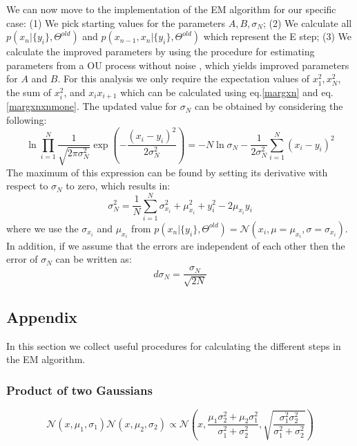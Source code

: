 \documentclass[%
 reprint,
 amsmath,amssymb,
 aps,
]{revtex4-1}
\begin{document}
We can now move to the implementation of the EM algorithm for our specific case: (1) We pick starting values for the parameters ${A,B,\sigma_N}$; (2) We calculate all $p\left( x_{n}|\{y_{i}\},\Theta^{old}\right)$ and $p\left( x_{n-1},x_{n}|\{y_{i}\},\Theta^{old}\right)$ which represent the E step; (3) We calculate the improved parameters by using the procedure for estimating parameters from a OU process without noise \cite{PRE}, which yields improved parameters for $A$ and $B$.  For this analysis we only require the expectation values of $x_{1}^{2},x_{N}^2$, the sum of $x_{i}^2$, and $x_{i}x_{i+1}$ which can be calculated using eq.\ref{margxn} and eq.\ref{margxnxnmone}.  The updated value for $\sigma_{N}$ can be obtained by considering the following:
\begin{equation}
	\ln \prod_{i=1}^{N}\frac{1}{\sqrt{2\pi\sigma_{N}^{2}}}\exp\left(-\frac{(x_{i}-y_{i})^2}{2\sigma_{N}^{2}}\right)=-N\ln\sigma_{N}-\frac{1}{2\sigma_{N}^2}\sum_{i=1}^{N}(x_{i}-y_{i})^2
\end{equation}
The maximum of this expression can be found by setting its derivative with respect to $\sigma_N$ to zero, which results in:
\begin{equation}
	\sigma_{N}^{2} = \frac{1}{N}\sum_{i=1}^{N}\sigma_{x_{i}}^{2}+\mu_{x_{i}}^{2}+y_{i}^{2}-2\mu_{x_{i}}y_{i}
\end{equation}
where we use the $\sigma_{x_{i}}$ and $\mu_{x_{i}}$ from $p\left( x_{n}|\{y_{i}\},\Theta^{old}\right)=\mathcal{N}(x_{i},\mu=\mu_{x_{i}},\sigma=\sigma_{x_{i}})$.  In addition, if we assume that the errors are independent of each other then the error of $\sigma_{N}$ can be written as:
\begin{equation}
	d\sigma_{N} = \frac{\sigma_{N}}{\sqrt{2N}}
\end{equation}
\subsection{Appendix}
In this section we collect useful procedures for calculating the different steps in the EM algorithm.
\subsubsection{Product of two Gaussians}
\begin{equation}
\mathcal{N}(x,\mu_{1},\sigma_{1})\mathcal{N}(x,\mu_{2},\sigma_{2}) 
\propto \mathcal{N}\left(x,\frac{\mu_{1}\sigma_{2}^{2}+\mu_{2}\sigma_{1}^{2}}{\sigma_{1}^2+\sigma_{2}^2},\sqrt{\frac{\sigma_{1}^2\sigma_{2}^2}{\sigma_{1}^2+\sigma_{2}^2}}\right)
\end{equation}
\end{document}
